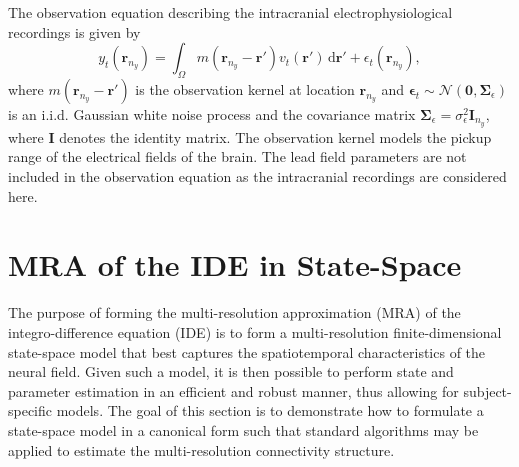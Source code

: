 \documentclass[review,authoryear,3p]{elsarticle}
\begin{document}
The observation equation describing the intracranial electrophysiological recordings is given by
\begin{equation}\label{eq:ObservationEquation}
	y_t(\mathbf{r}_{n_y}) = \int_{\Omega} { m\left(\mathbf{r}_{n_y}-\mathbf{r}'\right) v_t\left(\mathbf{r}'\right) \, \mathrm{d}\mathbf{r}'} + \epsilon_t(\mathbf{r}_{n_y}), 
\end{equation}
where $m\left(\mathbf{r}_{n_y}-\mathbf{r}'\right)$ is the observation kernel at location $\mathbf{r}_{n_y}$ and  $\boldsymbol{\epsilon}_{t}\sim \mathcal{N}\left(\mathbf{0},\mathbf{\Sigma}_{\epsilon}\right)$  is an i.i.d. Gaussian white noise process and the covariance matrix $\mathbf{\Sigma}_{\epsilon}=\sigma^2_{\epsilon}\mathbf I_{n_y}$, where $\mathbf I$ denotes the identity matrix. The observation kernel models the pickup range of the electrical fields of the brain. The lead field parameters are not included in the observation equation as the intracranial recordings are considered here. 

\section{MRA of the IDE in State-Space}
The purpose of forming the multi-resolution approximation (MRA) of the integro-difference equation (IDE) is to form a multi-resolution finite-dimensional state-space model that best captures the spatiotemporal characteristics of the neural field. Given such a model, it is then possible to perform state and parameter estimation in an efficient and robust manner, thus allowing for subject-specific models. The goal of this section is to demonstrate how to formulate a state-space model in a canonical form such that standard algorithms may be applied to estimate the multi-resolution connectivity structure.   
\end{document}
